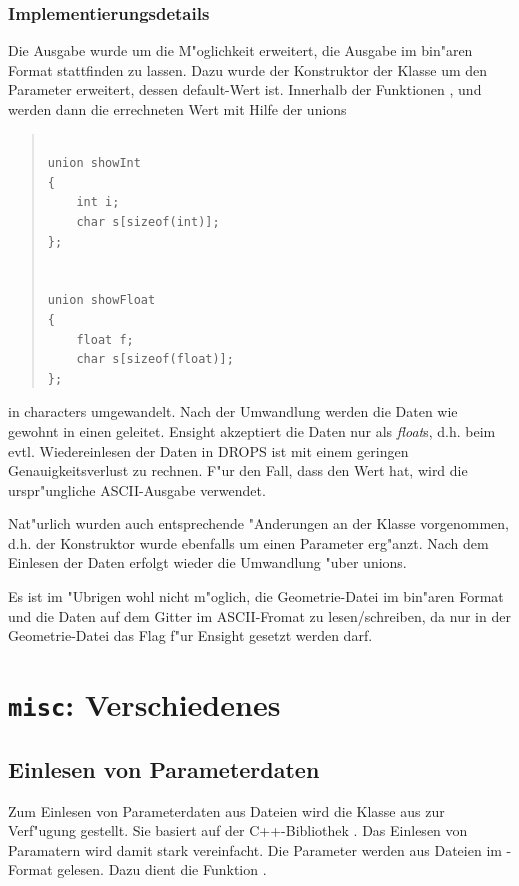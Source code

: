 \documentclass[11pt,a4paper]{article}
\newenvironment{Code}{\begin{quote}\scriptsize}{\end{quote}}
\begin{document}
\subsubsection{Implementierungsdetails}

Die Ausgabe  wurde um die M"oglichkeit erweitert, die Ausgabe im 
bin"aren Format stattfinden zu lassen. Dazu wurde der Konstruktor der Klasse
um den Parameter  erweitert, dessen default-Wert  ist.
Innerhalb der Funktionen ,  und   
werden dann die errechneten Wert mit Hilfe der unions
\begin{Code}
\begin{verbatim}

union showInt
{
    int i;
    char s[sizeof(int)];
};


union showFloat
{
    float f;
    char s[sizeof(float)];
};

\end{verbatim}
\end{Code}
in characters umgewandelt. 
Nach der Umwandlung werden die Daten wie gewohnt in einen  geleitet.
Ensight akzeptiert die Daten nur als \textit{float}s, d.h. beim evtl. Wiedereinlesen 
der Daten in DROPS ist mit einem geringen Genauigkeitsverlust zu rechnen. F"ur den Fall, dass
 den Wert  hat, wird die urspr"ungliche ASCII-Ausgabe verwendet. 

Nat"urlich wurden auch entsprechende "Anderungen an der Klasse 
vorgenommen, d.h. der Konstruktor wurde ebenfalls um einen Parameter  erg"anzt.
Nach dem Einlesen der Daten erfolgt wieder die Umwandlung "uber unions.

Es ist im "Ubrigen wohl nicht m"oglich, die Geometrie-Datei im bin"aren Format und die Daten
auf dem Gitter im ASCII-Fromat zu lesen/schreiben, da nur in der Geometrie-Datei das Flag 
 f"ur Ensight gesetzt werden darf.


\section{{\tt misc}: Verschiedenes}

\subsection{Einlesen von Parameterdaten}
Zum Einlesen von Parameterdaten aus Dateien wird die Klasse 
aus 
zur Verf"ugung gestellt. Sie basiert auf der C++-Bibliothek .
Das Einlesen von Paramatern wird damit stark vereinfacht. Die Parameter werden aus Dateien im -Format gelesen. Dazu dient die Funktion .
\end{document}
